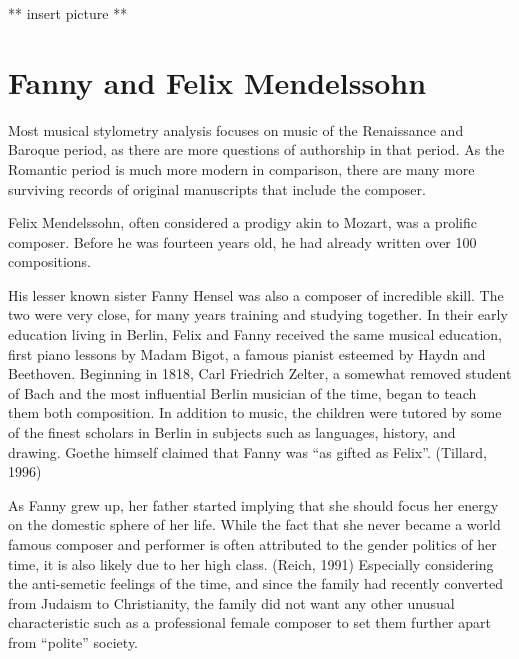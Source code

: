 \documentclass[12pt,twoside]{reedthesis}
\theoremstyle{definition}
\theoremstyle{definition}
\theoremstyle{definition}
\theoremstyle{remark}
\begin{document}
** insert picture **

\section{Fanny and Felix Mendelssohn}\label{fanny-and-felix-mendelssohn}

Most musical stylometry analysis focuses on music of the Renaissance and
Baroque period, as there are more questions of authorship in that
period. As the Romantic period is much more modern in comparison, there
are many more surviving records of original manuscripts that include the
composer.

Felix Mendelssohn, often considered a prodigy akin to Mozart, was a
prolific composer. Before he was fourteen years old, he had already
written over 100 compositions.

His lesser known sister Fanny Hensel was also a composer of incredible
skill. The two were very close, for many years training and studying
together. In their early education living in Berlin, Felix and Fanny
received the same musical education, first piano lessons by Madam Bigot,
a famous pianist esteemed by Haydn and Beethoven. Beginning in 1818,
Carl Friedrich Zelter, a somewhat removed student of Bach and the most
influential Berlin musician of the time, began to teach them both
composition. In addition to music, the children were tutored by some of
the finest scholars in Berlin in subjects such as languages, history,
and drawing. Goethe himself claimed that Fanny was ``as gifted as
Felix''. (Tillard, 1996)

As Fanny grew up, her father started implying that she should focus her
energy on the domestic sphere of her life. While the fact that she never
became a world famous composer and performer is often attributed to the
gender politics of her time, it is also likely due to her high class.
(Reich, 1991) Especially considering the anti-semetic feelings of the
time, and since the family had recently converted from Judaism to
Christianity, the family did not want any other unusual characteristic
such as a professional female composer to set them further apart from
``polite'' society.
\end{document}
